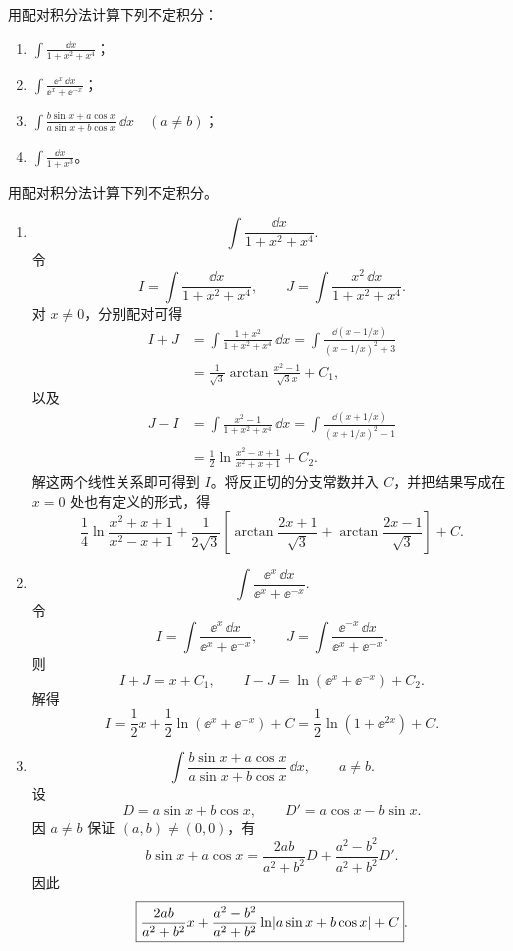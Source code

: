 \begin{xexercise}[2]
用配对积分法计算下列不定积分：
  \begin{enumerate}[label=(\arabic*)]
    \item $\displaystyle\int\frac{\dd x}{1+x^2+x^4}$；
    \item $\displaystyle\int\frac{\ee^x\,\dd x}{\ee^x+\ee^{-x}}$；
    \item $\displaystyle\int\frac{b\sin x+a\cos x}{a\sin x+b\cos x}\,\dd x\quad(a\ne b)$；
    \item $\displaystyle\int\frac{\dd x}{1+x^3}$。
  \end{enumerate}
\end{xexercise}
\begin{xsolution}
用配对积分法计算下列不定积分。
  \begin{enumerate}[label=(\arabic*)]
    \item
    \[
      \int\frac{\dd x}{1+x^2+x^4}.
    \]
    令
    \[
      I=\int\frac{\dd x}{1+x^2+x^4},
      \qquad
      J=\int\frac{x^2\,\dd x}{1+x^2+x^4}.
    \]
    对 $x\ne0$，分别配对可得
    \begin{align*}
      I+J
      &=\int\frac{1+x^2}{1+x^2+x^4}\,\dd x
       =\int\frac{\dd(x-1/x)}{(x-1/x)^2+3}\\
      &=\frac1{\sqrt3}\arctan\frac{x^2-1}{\sqrt3x}+C_1,
    \end{align*}
    以及
    \begin{align*}
      J-I
      &=\int\frac{x^2-1}{1+x^2+x^4}\,\dd x
       =\int\frac{\dd(x+1/x)}{(x+1/x)^2-1}\\
      &=\frac12\ln\frac{x^2-x+1}{x^2+x+1}+C_2.
    \end{align*}
    解这两个线性关系即可得到 $I$。将反正切的分支常数并入 $C$，并把结果写成在 $x=0$ 处也有定义的形式，得
    \[
      \boxed{
      \frac14\ln\frac{x^2+x+1}{x^2-x+1}
      +\frac1{2\sqrt3}\left[
        \arctan\frac{2x+1}{\sqrt3}
        +\arctan\frac{2x-1}{\sqrt3}
      \right]+C}.
    \]

    \item
    \[
      \int\frac{\ee^x\,\dd x}{\ee^x+\ee^{-x}}.
    \]
    令
    \[
      I=\int\frac{\ee^x\,\dd x}{\ee^x+\ee^{-x}},
      \qquad
      J=\int\frac{\ee^{-x}\,\dd x}{\ee^x+\ee^{-x}}.
    \]
    则
    \[
      I+J=x+C_1,
      \qquad
      I-J=\ln(\ee^x+\ee^{-x})+C_2.
    \]
    解得
    \[
      \boxed{I=\frac12x+\frac12\ln(\ee^x+\ee^{-x})+C}
      =\frac12\ln(1+\ee^{2x})+C.
    \]

    \item
    \[
      \int\frac{b\sin x+a\cos x}{a\sin x+b\cos x}\,\dd x,
      \qquad a\ne b.
    \]
    设
    \[
      D=a\sin x+b\cos x,
      \qquad
      D'=a\cos x-b\sin x.
    \]
    因 $a\ne b$ 保证 $(a,b)\ne(0,0)$，有
    \[
      b\sin x+a\cos x
      =\frac{2ab}{a^2+b^2}D
       +\frac{a^2-b^2}{a^2+b^2}D'.
    \]
    因此
    \[
      \boxed{
      \frac{2ab}{a^2+b^2}x
      +\frac{a^2-b^2}{a^2+b^2}\ln\lvert a\sin x+b\cos x\rvert+C}.
    \]


\end{enumerate}
\end{xsolution}
